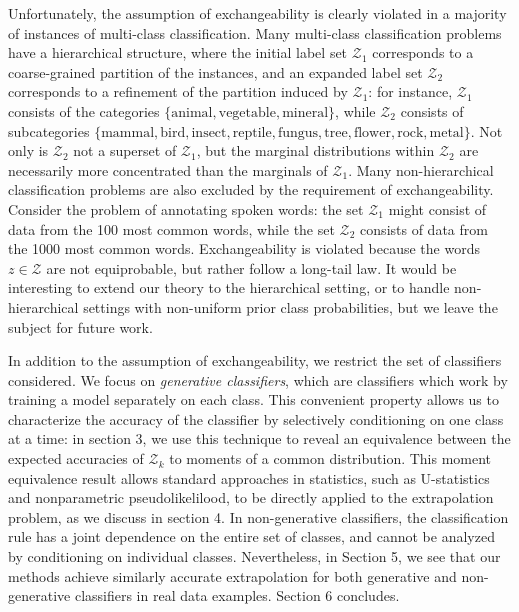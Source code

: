 \documentclass{article}
\begin{document}
Unfortunately, the assumption of exchangeability is clearly violated in a
majority of instances of multi-class classification.  Many multi-class classification problems
have a hierarchical structure, where the initial label set $\mathcal{Z}_1$ corresponds to a coarse-grained partition of the instances, and an expanded label set $\mathcal{Z}_2$ corresponds to a refinement of the partition induced by $\mathcal{Z}_1$:
for instance, $\mathcal{Z}_1$ consists of the categories $\{\text{animal}, \text{vegetable}, \text{mineral}\}$,
while $\mathcal{Z}_2$ consists of subcategories 
$\{\text{mammal}, \text{bird}, \text{insect}, \text{reptile}, \text{fungus}, \text{tree}, \text{flower}, \text{rock}, \text{metal}\}$.
Not only is $\mathcal{Z}_2$ not a superset of $\mathcal{Z}_1$, but the marginal distributions within $\mathcal{Z}_2$ are necessarily more concentrated than the marginals of $\mathcal{Z}_1$.
Many non-hierarchical classification problems are also excluded by the requirement of exchangeability.
Consider the problem of annotating spoken words: the set $\mathcal{Z}_1$ might consist of data from the 100 most common words, while the set $\mathcal{Z}_2$ consists of data from the 1000 most common words.
Exchangeability is violated because the words $z \in \mathcal{Z}$ are not equiprobable, but rather follow a long-tail law.
It would be interesting to extend our theory to the hierarchical setting, or to handle non-hierarchical settings
with non-uniform prior class probabilities, but we leave the subject for future work.

In addition to the assumption of exchangeability, we restrict the set of classifiers considered.
We focus on \emph{generative classifiers}, which are classifiers which work by training
a model separately on each class.  This convenient property 
allows us to characterize the accuracy of the classifier by selectively conditioning on one class at a time:
in section 3, we use this technique to reveal an equivalence between 
the expected accuracies of $\mathcal{Z}_k$ to moments of a common distribution.
This moment equivalence result allows standard approaches in statistics, such as U-statistics and
nonparametric pseudolikelilood, to be directly applied to the extrapolation problem, as we discuss in section 4.
In non-generative classifiers, the classification rule has a joint dependence on the entire set of classes,
and cannot be analyzed by conditioning on individual classes.
Nevertheless, in Section 5, we see that our methods achieve similarly accurate extrapolation for both
generative and non-generative classifiers in real data examples.  Section 6 concludes.
\end{document}
